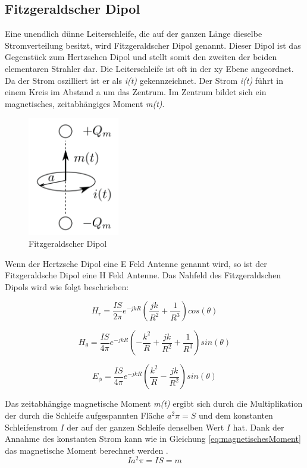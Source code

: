 \subsection{Fitzgeraldscher Dipol }\label{sec:FitzgeraldescherDipol}
Eine unendlich dünne Leiterschleife, die auf der ganzen Länge dieselbe Stromverteilung besitzt, wird Fitzgeraldscher Dipol genannt. Dieser Dipol ist das Gegenstück zum Hertzschen Dipol und stellt somit den zweiten der beiden elementaren Strahler dar. Die Leiterschleife ist oft in der xy Ebene angeordnet. Da der Strom oszilliert ist er als \textit{i(t)} gekennzeichnet. Der Strom \textit{i(t)} führt in einem Kreis im Abstand a um das Zentrum. Im Zentrum bildet sich ein magnetisches, zeitabhängiges Moment \textit{m(t)}.
\begin{figure}[!htb]
	\centering
	\includegraphics[width=4cm]{content/bilder/Fitzgerald_Dipol_EMANT_S37.pdf}%
	\caption{Fitzgeraldscher Dipol \cite{Emant}}
	\label{FitzDipol}
\end{figure}
Wenn der Hertzsche Dipol eine E Feld Antenne genannt wird, so ist der Fitzgeraldsche Dipol eine H Feld Antenne. Das Nahfeld des Fitzgeraldschen Dipols wird wie folgt beschrieben\cite{elliott1981antenna}:

\begin{equation}
H_r= \frac{I S}{2\pi}   e^{-jkR} \left( \frac{jk}{R^{2}}  + \frac{1}{R^{3}} \right) cos(\theta)
\end{equation}

\begin{equation}
H_\theta= \frac{I S}{4\pi}   e^{-jkR} \left(- \frac{k^{2}}{R}  + \frac{jk}{R^{2}}+ \frac{1}{R^{3}} \right) sin(\theta)
\end{equation}

\begin{equation}
E_\phi= \frac{I S}{4\pi}   e^{-jkR} \left( \frac{k^{2}}{R}  - \frac{jk}{R^{2}} \right) sin(\theta)
\end{equation}

Das zeitabhängige magnetische Moment \textit{m(t)} ergibt sich durch die Multiplikation der durch die Schleife aufgespannten Fläche $a^{2}\pi=S$ und dem konstanten Schleifenstrom $I$ der auf der ganzen Schleife denselben Wert $I$ hat. Dank der Annahme des konstanten Strom kann wie in Gleichung \ref{eq:magnetischesMoment} das magnetische Moment berechnet werden \cite{Harrington-TimeHarmonic}. 
\begin{equation}\label{eq:magnetischesMoment}
Ia^{2}\pi=IS=m
\end{equation}

